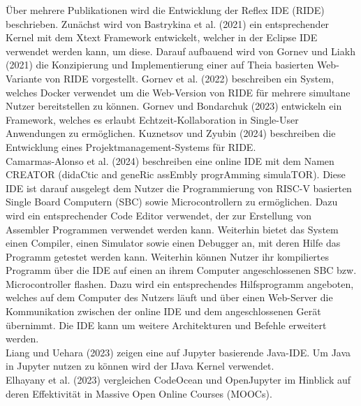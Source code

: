 Über mehrere Publikationen wird die Entwicklung der Reflex IDE (RIDE) beschrieben.  Zunächst wird von Bastrykina et al. (2021)
ein entsprechender Kernel mit dem Xtext Framework entwickelt, welcher in der Eclipse IDE verwendet werden kann, um diese. Darauf aufbauend wird von Gornev und Liakh (2021)
die Konzipierung und Implementierung einer auf Theia basierten Web-Variante von RIDE vorgestellt. Gornev et al. (2022)
beschreiben ein System, welches Docker verwendet um die Web-Version von RIDE für mehrere simultane Nutzer bereitstellen zu können. Gornev und Bondarchuk (2023)
entwickeln ein Framework, welches es erlaubt Echtzeit-Kollaboration in Single-User Anwendungen zu ermöglichen. Kuznetsov und Zyubin (2024)
beschreiben die Entwicklung eines Projektmanagement-Systems für RIDE. \\

Camarmas-Alonso et al. (2024)
beschreiben eine online IDE mit dem Namen CREATOR (didaCtic and geneRic assEmbly progrAmming simulaTOR). Diese IDE ist darauf ausgelegt dem Nutzer die Programmierung von RISC-V basierten Single Board Computern (SBC) sowie Microcontrollern zu ermöglichen. Dazu wird ein entsprechender Code Editor verwendet, der zur Erstellung von Assembler Programmen verwendet werden kann. Weiterhin bietet das System einen Compiler, einen Simulator sowie einen Debugger an, mit deren Hilfe das Programm getestet werden kann. Weiterhin können Nutzer ihr kompiliertes Programm über die IDE auf einen an ihrem Computer angeschlossenen SBC bzw. Microcontroller flashen. Dazu wird ein entsprechendes Hilfsprogramm angeboten, welches auf dem Computer des Nutzers läuft und über einen Web-Server die Kommunikation zwischen der online IDE und dem angeschlossenen Gerät übernimmt. Die IDE kann um weitere Architekturen und Befehle erweitert werden. \\

Liang und Uehara (2023)
zeigen eine auf Jupyter basierende Java-IDE. Um Java in Jupyter nutzen zu können wird der IJava Kernel verwendet. \\

Elhayany et al. (2023)
vergleichen CodeOcean und OpenJupyter im Hinblick auf deren Effektivität in Massive Open Online Courses (MOOCs).